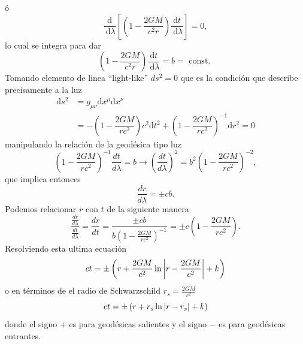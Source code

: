 ó
\begin{equation}
    \frac{\mathrm{d}}{\mathrm{~d} \lambda}\left[\left(1-\dfrac{2 G M}{c^2 r}\right) \frac{\mathrm{d} t}{\mathrm{~d} \lambda}\right]=0,
\end{equation}
lo cual se integra para dar
\begin{equation}
    \left(1-\dfrac{2 G M}{c^2 r}\right) \frac{\mathrm{d} t}{\mathrm{~d} \lambda}=b=\text { const. }
\end{equation}
Tomando elemento de linea ``light-like'' $ds^2 = 0$ que es la condición que describe precisamente a la luz
\begin{equation}
    \begin{aligned}
        \mathrm{d} s^2 & =g_{\mu \nu} \mathrm{d} x^\mu \mathrm{d} x^\nu                                                                      \\
                       & =-\left(1-\dfrac{2 G M}{r c^2}\right)c^2 \mathrm{d} t^2+\left(1-\dfrac{2 G M}{r c^2}\right)^{-1} \mathrm{d} r^2 = 0
    \end{aligned}
\end{equation}
manipulando la relación de la geodésica tipo luz
\begin{equation}
    \left(1-\frac{2 G M}{r c^2}\right)^{-1} \frac{dt}{d\lambda}  = b \rightarrow  \left(\frac{dt}{d\lambda}\right)^2 = b^2 \left(1-\frac{2 G M}{r c^2}\right)^{-2},
\end{equation}
que implica  entonces
\begin{equation}
    \frac{d r }{d \lambda}= \pm cb.
\end{equation}
Podemos relacionar $r$ con $t$  de la siguiente manera
\begin{equation}
    \frac{\frac{dr}{d\lambda}}{\frac{dt}{d\lambda}} =   \frac{dr}{dt} =  \frac{\pm cb }{ b \left(1-\frac{2 G M}{r c^2}\right)^{-1}} = \pm c \left(1-\frac{2 G M}{r c^2}\right).
\end{equation}
Resolviendo esta ultima ecuación
\begin{equation}
    ct = \pm \left(r + \frac{2 G M}{c^2} \ln \left| r -\frac{2 G M}{c^2}  \right| + k \right)
\end{equation}
o en términos de el radio de Schwarzschild $r_s = \frac{2 G M}{c^2}$
\begin{equation}
    ct = \pm \left(r + r_s \ln\left| r - r_s \right| + k \right)
    \label{eq:lightRaysSchwarzschild}
\end{equation}
donde el signo $+$ es para geodésicas salientes y el signo $-$ es para geodésicas entrantes.
